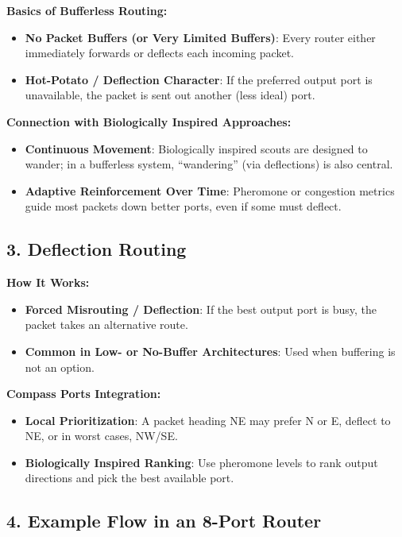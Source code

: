 \documentclass[../../../OAE-SPEC-MAIN.tex]{subfiles}
\begin{document}
\textbf{Basics of Bufferless Routing:}
\begin{itemize}
    \item \textbf{No Packet Buffers (or Very Limited Buffers)}: Every router either immediately forwards or deflects each incoming packet.
    \item \textbf{Hot-Potato / Deflection Character}: If the preferred output port is unavailable, the packet is sent out another (less ideal) port.
\end{itemize}

\textbf{Connection with Biologically Inspired Approaches:}
\begin{itemize}
    \item \textbf{Continuous Movement}: Biologically inspired scouts are designed to wander; in a bufferless system, “wandering” (via deflections) is also central.
    \item \textbf{Adaptive Reinforcement Over Time}: Pheromone or congestion metrics guide most packets down better ports, even if some must deflect.
\end{itemize}

\subsection*{3. Deflection Routing}

\textbf{How It Works:}
\begin{itemize}
    \item \textbf{Forced Misrouting / Deflection}: If the best output port is busy, the packet takes an alternative route.
    \item \textbf{Common in Low- or No-Buffer Architectures}: Used when buffering is not an option.
\end{itemize}

\textbf{Compass Ports Integration:}
\begin{itemize}
    \item \textbf{Local Prioritization}: A packet heading NE may prefer N or E, deflect to NE, or in worst cases, NW/SE.
    \item \textbf{Biologically Inspired Ranking}: Use pheromone levels to rank output directions and pick the best available port.
\end{itemize}

\subsection*{4. Example Flow in an 8-Port Router}
\end{document}
